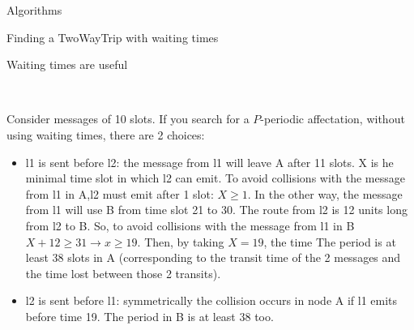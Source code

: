\documentclass[a4paper,10pt]{report}
\begin{document}
\begin{chapter}{Algorithms}
\begin{section}{Finding a TwoWayTrip with waiting times}
\begin{subsection}{Waiting times are useful}
\begin{center}
{{{
  }}}\\
\end{center}

Consider messages of 10 slots. If you search for a $P$-periodic affectation, without using waiting times, there are 2 choices: 
\begin{itemize}
 \item l1 is sent before l2: the message from l1 will leave A after 11 slots. X is he minimal time slot in which l2 can emit. 
 To avoid collisions with the message from l1 in A,l2 must emit after 1 slot:  $X\ge1$.
 In the other way, the message from l1 will use B from time slot 21 to 30. The route from l2 is 12 units long from l2 to B. So, to avoid collisions with 
 the message from l1 in B $X+12 \ge 31 \rightarrow x\ge 19$. Then, by taking $X=19$, the time
 The period is at least 38 slots in A (corresponding to the transit time of the 2 messages and the time lost between those 2 transits).
 \item l2 is sent before l1: symmetrically the collision occurs in node A if l1 emits before time 19. The period in B is at least 38 too.
\end{itemize}

\end{subsection}
\end{section}
\end{chapter}
\end{document}
